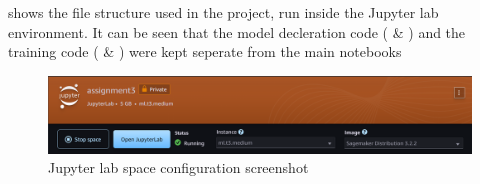  shows the file structure used in the project, run inside the Jupyter lab environment. It can be seen that the model decleration code ( \& )  and the training code ( \& ) were kept seperate from the main notebooks


\begin{figure}[h]
    \centering
    \includegraphics[width=0.8\linewidth]{figures/jupyter_lab_space_config.png} %
    \centering
    \caption{Jupyter lab space configuration screenshot} %
    \label{fig:jupyter_lab_space_config} %
\end{figure}

